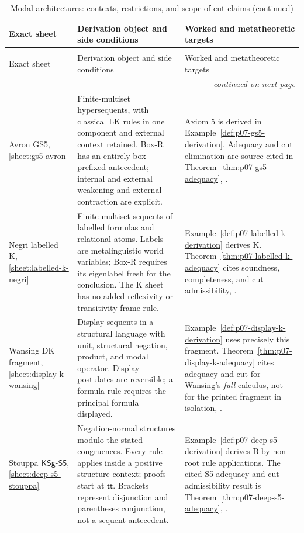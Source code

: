 \begingroup\small
\begin{longtable}{@{}p{.20\linewidth}p{.34\linewidth}p{.38\linewidth}@{}}
\caption{Modal architectures: contexts, restrictions, and scope of cut claims.}
\label{tab:p14-nonclassical-modal-architectures}\\
\toprule
Exact sheet & Derivation object and side conditions & Worked and metatheoretic targets \\
\midrule\endfirsthead
\caption[]{Modal architectures: contexts, restrictions, and scope of cut claims (continued)}\\
\toprule Exact sheet & Derivation object and side conditions & Worked and metatheoretic targets \\
\midrule\endhead
\midrule\multicolumn{3}{r}{\emph{continued on next page}}\\
\endfoot
\endlastfoot
Avron GS5, \ref{sheet:gs5-avron} & Finite-multiset hypersequents, with
classical LK rules in one component and external context retained.
Box-R has an entirely box-prefixed antecedent; internal and external
weakening and external contraction are explicit. & Axiom 5 is derived in
Example~\ref{def:p07-gs5-derivation}. Adequacy and cut elimination are
source-cited in Theorem~\ref{thm:p07-gs5-adequacy}, \cite{Avron1996}. \\
\addlinespace
Negri labelled K, \ref{sheet:labelled-k-negri} & Finite-multiset sequents
of labelled formulas and relational atoms. Labels are metalinguistic world
variables; Box-R requires its eigenlabel fresh for the conclusion.
The K sheet has no added reflexivity or transitivity frame rule. &
Example~\ref{def:p07-labelled-k-derivation} derives K.
Theorem~\ref{thm:p07-labelled-k-adequacy} cites soundness, completeness,
and cut admissibility, \cite{Negri2005}. \\
\addlinespace
Wansing DK fragment, \ref{sheet:display-k-wansing} & Display sequents
in a structural language with unit, structural negation, product, and modal
operator. Display postulates are reversible; a formula rule requires the
principal formula displayed. &
Example~\ref{def:p07-display-k-derivation} uses precisely this fragment.
Theorem~\ref{thm:p07-display-k-adequacy} cites adequacy and cut for
Wansing's \emph{full} calculus, not for the printed fragment in isolation,
\cite{Wansing1994}. \\
\addlinespace
Stouppa \(\mathsf{KSg\mbox{-}S5}\), \ref{sheet:deep-s5-stouppa} &
Negation-normal structures modulo the stated congruences. Every rule applies
inside a positive structure context; proofs start at \(\mathsf{tt}\).
Brackets represent disjunction and parentheses conjunction, not a sequent
antecedent. & Example~\ref{def:p07-deep-s5-derivation} derives B by
non-root rule applications. The cited S5 adequacy and cut-admissibility
result is Theorem~\ref{thm:p07-deep-s5-adequacy}, \cite{Stouppa2007}. \\
\bottomrule
\end{longtable}\endgroup

